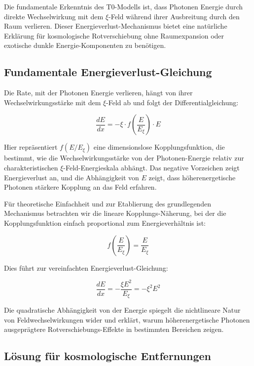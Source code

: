\documentclass[12pt,a4paper]{article}
\begin{document}
	Die fundamentale Erkenntnis des T0-Modells ist, dass Photonen Energie durch direkte Wechselwirkung mit dem $\xi$-Feld während ihrer Ausbreitung durch den Raum verlieren. Dieser Energieverlust-Mechanismus bietet eine natürliche Erklärung für kosmologische Rotverschiebung ohne Raumexpansion oder exotische dunkle Energie-Komponenten zu benötigen.
	
	\subsection{Fundamentale Energieverlust-Gleichung}
	
	Die Rate, mit der Photonen Energie verlieren, hängt von ihrer Wechselwirkungsstärke mit dem $\xi$-Feld ab und folgt der Differentialgleichung:
	
	\begin{equation}
		\frac{dE}{dx} = -\xi \cdot f\left(\frac{E}{E_\xi}\right) \cdot E
	\end{equation}
	
	Hier repräsentiert $f(E/E_\xi)$ eine dimensionslose Kopplungsfunktion, die bestimmt, wie die Wechselwirkungsstärke von der Photonen-Energie relativ zur charakteristischen $\xi$-Feld-Energieskala abhängt. Das negative Vorzeichen zeigt Energieverlust an, und die Abhängigkeit von $E$ zeigt, dass höherenergetische Photonen stärkere Kopplung an das Feld erfahren.
	
	Für theoretische Einfachheit und zur Etablierung des grundlegenden Mechanismus betrachten wir die lineare Kopplungs-Näherung, bei der die Kopplungsfunktion einfach proportional zum Energieverhältnis ist:
	
	\begin{equation}
		f\left(\frac{E}{E_\xi}\right) = \frac{E}{E_\xi}
	\end{equation}
	
	Dies führt zur vereinfachten Energieverlust-Gleichung:
	
	\begin{equation}
		\frac{dE}{dx} = -\frac{\xi E^2}{E_\xi} = -\xi^2 E^2
	\end{equation}
	
	Die quadratische Abhängigkeit von der Energie spiegelt die nichtlineare Natur von Feldwechselwirkungen wider und erklärt, warum höherenergetische Photonen ausgeprägtere Rotverschiebungs-Effekte in bestimmten Bereichen zeigen.
	
	\subsection{Lösung für kosmologische Entfernungen}
	
\end{document}
